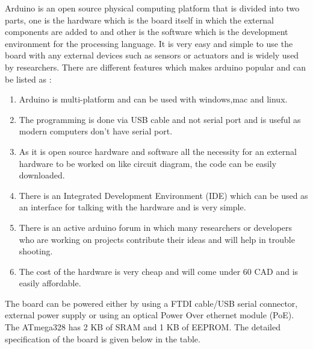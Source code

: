 \documentclass[12pt,a4paper,oneside]{report}
\begin{document}
Arduino is an open source physical computing platform that is divided into two parts, one is the hardware which is the board itself in which the external components are added to and other is the software which is the development environment for the  processing language. It is very easy and simple to use the board with any external devices such as sensors or actuators and is widely used by researchers. There are different features which makes arduino popular and can be listed as \cite{Banzi2008}:


\begin{enumerate}


  \item Arduino is multi-platform and can be used with windows,mac and linux.

  \item The programming is done via USB cable and not serial port and is useful as modern computers don't have serial port.

  \item As it is open source hardware and software all the necessity for an external hardware to be worked on like circuit diagram, the code can be easily downloaded.
  
  \item There is an Integrated Development Environment (IDE) which can be used as an interface for talking with the hardware and is very simple.
  
  \item There is an active arduino forum in which many researchers or developers who are working on projects contribute their ideas and will help in trouble shooting.
  
  \item The cost of the hardware is very cheap and will come under 60 CAD and is easily affordable.
  
\end{enumerate}

The board can be powered either by using a FTDI cable/USB serial connector, external power supply or using an optical Power Over ethernet module (PoE). The ATmega328 has 2 KB of SRAM and 1 KB of EEPROM. The detailed specification\cite{Guti2017} of the board is given below in the table.
 
\end{document}
